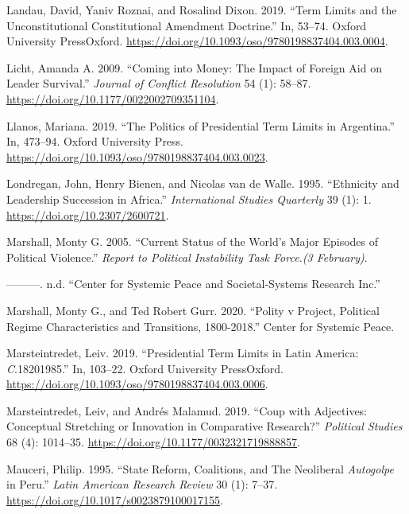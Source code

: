 \documentclass[
  12pt,
]{report}
\newlength{\cslhangindent}
\newenvironment{CSLReferences}[2] %
 {\begin{list}{}{%
  \setlength{\itemindent}{0pt}
  \setlength{\leftmargin}{0pt}
  \setlength{\parsep}{0pt}
  \ifodd #1
   \setlength{\leftmargin}{\cslhangindent}
   \setlength{\itemindent}{-1\cslhangindent}
  \fi
  \setlength{\itemsep}{#2\baselineskip}}}
 {\end{list}}
\begin{document}
\begin{CSLReferences}{1}{0}
Landau, David, Yaniv Roznai, and Rosalind Dixon. 2019. {``Term Limits
and the Unconstitutional Constitutional Amendment Doctrine.''} In,
53--74. Oxford University PressOxford.
\url{https://doi.org/10.1093/oso/9780198837404.003.0004}.

Licht, Amanda A. 2009. {``Coming into Money: The Impact of Foreign Aid
on Leader Survival.''} \emph{Journal of Conflict Resolution} 54 (1):
58--87. \url{https://doi.org/10.1177/0022002709351104}.

Llanos, Mariana. 2019. {``The Politics of Presidential Term Limits in
Argentina.''} In, 473--94. Oxford University Press.
\url{https://doi.org/10.1093/oso/9780198837404.003.0023}.

Londregan, John, Henry Bienen, and Nicolas van de Walle. 1995.
{``Ethnicity and Leadership Succession in Africa.''} \emph{International
Studies Quarterly} 39 (1): 1. \url{https://doi.org/10.2307/2600721}.

Marshall, Monty G. 2005. {``Current Status of the World's Major Episodes
of Political Violence.''} \emph{Report to Political Instability Task
Force.(3 February)}.

---------. n.d. {``Center for Systemic Peace and Societal-Systems
Research Inc.''}

Marshall, Monty G., and Ted Robert Gurr. 2020. {``Polity v Project,
Political Regime Characteristics and Transitions, 1800-2018.''} Center
for Systemic Peace.

Marsteintredet, Leiv. 2019. {``Presidential Term Limits in Latin
America: {\emph{C}}.1820{\textendash}1985.''} In, 103--22. Oxford
University PressOxford.
\url{https://doi.org/10.1093/oso/9780198837404.003.0006}.

Marsteintredet, Leiv, and Andrés Malamud. 2019. {``Coup with Adjectives:
Conceptual Stretching or Innovation in Comparative Research?''}
\emph{Political Studies} 68 (4): 1014--35.
\url{https://doi.org/10.1177/0032321719888857}.

Mauceri, Philip. 1995. {``State Reform, Coalitions, and The Neoliberal
{\emph{Autogolpe}} in Peru.''} \emph{Latin American Research Review} 30
(1): 7--37. \url{https://doi.org/10.1017/s0023879100017155}.


\end{CSLReferences}
\end{document}
